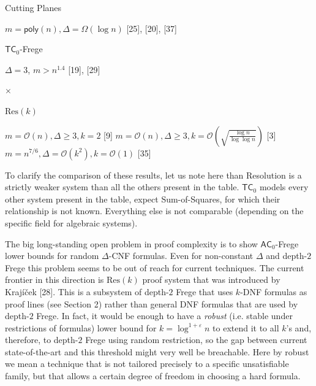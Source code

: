 Cutting Planes





$m={\mathsf{poly}}(n),\Delta=\Omega(\log n)$
[25], [20], [37]






${\mathsf{TC}}_{0}$-Frege




$\Delta=3$, $m>n^{1.4}$ [19], [29]




$\times$






$\mathrm{Res}(k)$





$m=\mathcal{O}\left(n\right),\Delta\geq 3,k=2$ [9]
$m=\mathcal{O}\left(n\right),\Delta\geq 3,k=\mathcal{O}\left(\sqrt{\frac{\log n%
}{\log\log n}}\right)$
[3]
$m=n^{7/6},\Delta=\mathcal{O}\left(k^{2}\right),k=\mathcal{O}\left(1\right)$ [35]








To clarify the comparison of these results, let us note here than Resolution is a strictly weaker system
than all the others present in the table. ${\mathsf{TC}}_{0}$ models every other system present in the table, expect
Sum-of-Squares, for which their relationship is not known. Everything else is not comparable (depending
on the specific field for algebraic systems).\par




The big long-standing open problem in proof complexity is to show ${\mathsf{AC}}_{0}$-Frege lower bounds for random
$\Delta$-CNF formulas. Even for non-constant $\Delta$ and depth-$2$ Frege this problem seems to be out of
reach for current techniques. The current frontier in this direction is $\mathrm{Res}(k)$ proof system that was
introduced by Krajíček [28]. This is a subsystem of depth-$2$ Frege that uses
$k$-DNF formulas as proof lines (see Section 2) rather than general DNF formulas that are
used by depth-$2$ Frege. In fact, it would be enough to have a \emph{robust} (i.e. stable under
restrictions of formulas) lower bound for $k=\log^{1+\varepsilon}n$ to extend it to all $k$’s and,
therefore, to depth-$2$ Frege using random restriction, so the gap between current state-of-the-art and
this threshold might very well be breachable. Here by robust we mean a technique that is not tailored
precisely to a specific unsatisfiable family, but that allows a certain degree of freedom in choosing a
hard formula.\par




